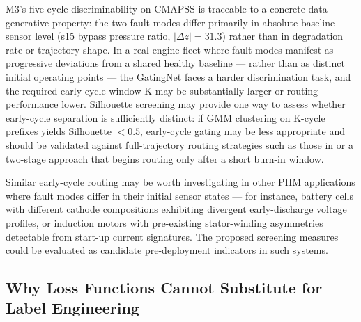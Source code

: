 \documentclass[review,12pt]{elsarticle}
\begin{document}
M3's five-cycle discriminability on CMAPSS is traceable to a concrete data-generative property: the two fault modes differ primarily in absolute baseline sensor level (s15 bypass pressure ratio, $|\Delta z| = 31.3$) rather than in degradation rate or trajectory shape. In a real-engine fleet where fault modes manifest as progressive deviations from a shared healthy baseline --- rather than as distinct initial operating points --- the GatingNet faces a harder discrimination task, and the required early-cycle window K may be substantially larger or routing performance lower. Silhouette screening may provide one way to assess whether early-cycle separation is sufficiently distinct: if GMM clustering on K-cycle prefixes yields Silhouette $< 0.5$, early-cycle gating may be less appropriate and should be validated against full-trajectory routing strategies such as those in \cite{ref46,ref47} or a two-stage approach that begins routing only after a short burn-in window.

Similar early-cycle routing may be worth investigating in other PHM applications where fault modes differ in their initial sensor states --- for instance, battery cells with different cathode compositions exhibiting divergent early-discharge voltage profiles, or induction motors with pre-existing stator-winding asymmetries detectable from start-up current signatures. The proposed screening measures could be evaluated as candidate pre-deployment indicators in such systems.

\subsection{Why Loss Functions Cannot Substitute for Label Engineering}
\end{document}
